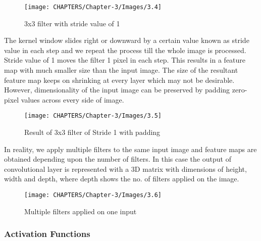 \begin{figure}[H]
	\centering
		\texttt{[image: CHAPTERS/Chapter-3/Images/3.4]}
	\caption{3x3 filter with stride value of 1}
	\label{fig:3.4}
\end{figure}

The kernel window slides right or downward by a 
certain value known as stride value in each step and we repeat the process
till the whole image is processed. Stride value of
1 moves the filter 1 pixel in each step. This results in a feature map with 
much smaller size than the input image. The size of the resultant feature map keeps on shrinking at every layer 
which may not be  desirable. However, dimensionality of the input image can be 
preserved by padding zero-pixel values across every side of image.

\begin{figure}[H]
	\centering
		\texttt{[image: CHAPTERS/Chapter-3/Images/3.5]}
	\caption{Result  of 3x3 filter of Stride 1 with padding}
	\label{fig:3.5}
\end{figure}

In reality, we apply multiple filters to the same 
input image and feature maps are obtained depending upon the 
number of filters. In this case the output of convolutional layer 
is represented with a 3D matrix with dimensions of height, width 
and depth, where depth 
shows the no. of filters applied on the image. 

\begin{figure}[H]
	\centering
		\texttt{[image: CHAPTERS/Chapter-3/Images/3.6]}
	\caption{Multiple filters applied on one input}
	\label{fig:3.6}
\end{figure}

\subsubsection{Activation Functions}

